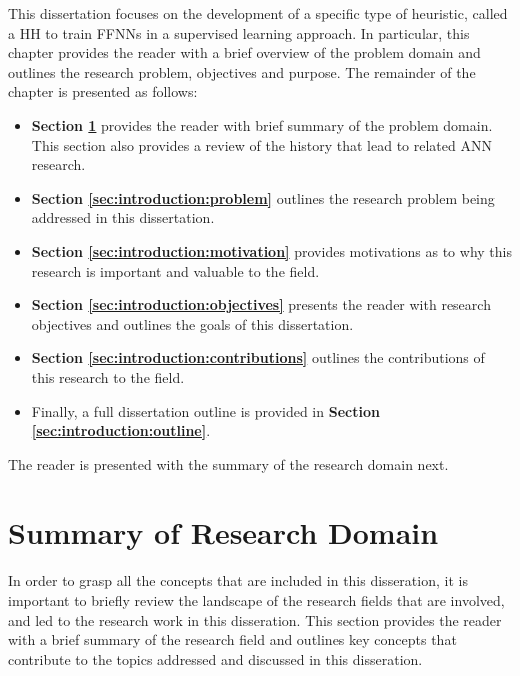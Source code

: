 This dissertation focuses on the development of a specific type of heuristic, called a \acl{HH} to train \acp{FFNN} in a supervised learning approach. In particular, this chapter provides the reader with a brief overview of the problem domain and outlines the research problem, objectives and purpose. The remainder of the chapter is presented as follows:

\begin{itemize}
      \item \textbf{Section \ref{sec:introduction:summary_research_domain}} provides the reader with brief summary of the problem domain. This section also provides a review of the history that lead to related \ac{ANN} research.

      \item \textbf{Section \ref{sec:introduction:problem}} outlines the research problem being addressed in this dissertation.

      \item \textbf{Section \ref{sec:introduction:motivation}} provides motivations as to why this research is important and valuable to the field.

      \item \textbf{Section \ref{sec:introduction:objectives}} presents the reader with research objectives and outlines the goals of this dissertation.

      \item \textbf{Section \ref{sec:introduction:contributions}} outlines the contributions of this research to the field.

      \item Finally, a full dissertation outline is provided in \textbf{Section \ref{sec:introduction:outline}}.
\end{itemize}

The reader is presented with the summary of the research domain next.

\section{Summary of Research Domain}\label{sec:introduction:summary_research_domain}

In order to grasp all the concepts that are included in this disseration, it is important to briefly review the landscape of the research fields that are involved, and led to the research work in this disseration. This section provides the reader with a brief summary of the research field and outlines key concepts  that contribute to the topics addressed and discussed in this disseration.

